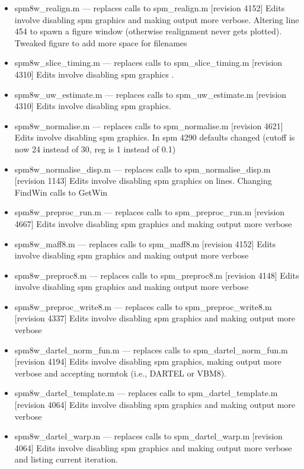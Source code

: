 \documentclass[12pt]{article}
\begin{document}
\begin{itemize}
	\item spm8w\_realign.m  --- replaces calls to spm\_realign.m [revision 4152]
Edits involve disabling spm graphics and making output more verbose. Altering line 454 to spawn a figure window (otherwise realignment never gets plotted). Tweaked figure to add more space for filenames
	\item spm8w\_slice\_timing.m --- replaces calls to spm\_slice\_timing.m [revision 4310]
Edits involve disabling spm graphics .
	\item spm8w\_uw\_estimate.m --- replaces calls to spm\_uw\_estimate.m [revision 4310]
Edits involve disabling spm graphics.
	\item spm8w\_normalise.m --- replaces calls to spm\_normalise.m [revision 4621]
Edits involve disabling spm graphics. In spm 4290 defaults changed (cutoff is now 24 instead of 30, reg is 1 instead of 0.1) 
	\item spm8w\_normalise\_disp.m  --- replaces calls to spm\_normalise\_disp.m [revision 1143]
Edits involve disabling spm graphics on lines. Changing FindWin calls to GetWin
	\item spm8w\_preproc\_run.m  --- replaces calls to spm\_preproc\_run.m [revision 4667]
Edits involve disabling spm graphics and making output more verbose
	\item spm8w\_maff8.m  --- replaces calls to spm\_maff8.m [revision 4152]
Edits involve disabling spm graphics and making output more verbose
	\item spm8w\_preproc8.m  --- replaces calls to spm\_preproc8.m [revision 4148]
Edits involve disabling spm graphics and making output more verbose
	\item spm8w\_preproc\_write8.m  --- replaces calls to spm\_preproc\_write8.m [revision 4337]
Edits involve disabling spm graphics and making output more verbose
	\item spm8w\_dartel\_norm\_fun.m  --- replaces calls to spm\_dartel\_norm\_fun.m [revision 4194]
Edits involve disabling spm graphics, making output more verbose and accepting normtok (i.e., DARTEL or VBM8). 
	\item spm8w\_dartel\_template.m  --- replaces calls to spm\_dartel\_template.m [revision 4064]
Edits involve disabling spm graphics and making output more verbose
	\item spm8w\_dartel\_warp.m  --- replaces calls to spm\_dartel\_warp.m [revision 4064]
Edits involve disabling spm graphics and making output more verbose and listing current iteration.
\end{itemize}
\end{document}
